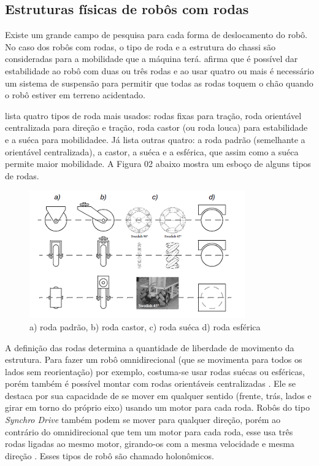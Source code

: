 \subsection{Estruturas físicas de robôs com rodas}

Existe um grande campo de pesquisa para cada forma de deslocamento do robô. No caso dos robôs com rodas, o tipo de roda e a estrutura do chassi são consideradas para a mobilidade que a máquina terá. \cite{Siegwart2004} afirma que é possível dar estabilidade ao robô com duas ou três rodas e ao usar quatro ou mais é necessário um sistema de suspensão para permitir que todas as rodas toquem o chão quando o robô estiver em terreno acidentado.

\cite{Secchi2008} lista quatro tipos de roda mais usados: rodas fixas para tração, roda orientável centralizada para direção e tração, roda castor (ou roda louca) para estabilidade e a suéca para mobilidadee. Já \cite{Rolland2004} lista outras quatro: a roda padrão (semelhante a orientável centralizada), a castor, a suéca e a esférica, que assim como a suéca permite maior mobilidade. A Figura 02 abaixo mostra um esboço de alguns tipos de rodas.

\begin{figure}[h]
	\centering
	\label{fig02}
		\includegraphics[keepaspectratio=true,scale=1]{figuras/1rodas.png}
	\caption{a) roda padrão, b) roda castor, c) roda suéca d) roda esférica \cite{Siegwart2004}}
\end{figure}

A definição das rodas determina a quantidade de liberdade de movimento da estrutura. Para fazer um robô omnidirecional (que se movimenta para todos os lados sem reorientação) por exemplo, costuma-se usar rodas suécas ou esféricas, porém também é possível montar com rodas orientáveis centralizadas \cite{Secchi2008}. Ele se destaca por sua capacidade de se mover em qualquer sentido (frente, trás, lados e girar em torno do próprio eixo) usando um motor para cada roda. Robôs do tipo \textit{Synchro Drive} também podem se mover para qualquer direção, porém ao contrário do omnidirecional que tem um motor para cada roda, esse usa três rodas ligadas ao mesmo motor, girando-os com a mesma velocidade e mesma direção \cite{Borenstein1996}. Esses tipos de robô são chamado holonômicos.

